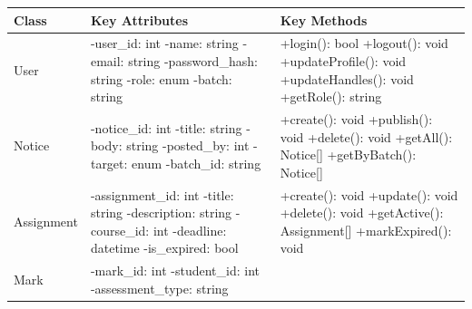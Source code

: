 \documentclass[12pt,a4paper]{article}
\newcommand{\THH}[1]{\small\bfseries\color{white} #1}
\begin{document}
\vspace{0.4em}
\begin{longtable}{|p{2.8cm}|p{5.5cm}|p{5.2cm}|}
\hline
\rowcolor{navyblue}
\THH{Class} & \THH{Key Attributes} & \THH{Key Methods} \\
\hline
\endhead
User &
-user\_id: int \newline
-name: string \newline
-email: string \newline
-password\_hash: string \newline
-role: enum \newline
-batch: string &
+login(): bool \newline
+logout(): void \newline
+updateProfile(): void \newline
+updateHandles(): void \newline
+getRole(): string \\
\hline
Notice &
-notice\_id: int \newline
-title: string \newline
-body: string \newline
-posted\_by: int \newline
-target: enum \newline
-batch\_id: string &
+create(): void \newline
+publish(): void \newline
+delete(): void \newline
+getAll(): Notice[] \newline
+getByBatch(): Notice[] \\
\hline
Assignment &
-assignment\_id: int \newline
-title: string \newline
-description: string \newline
-course\_id: int \newline
-deadline: datetime \newline
-is\_expired: bool &
+create(): void \newline
+update(): void \newline
+delete(): void \newline
+getActive(): Assignment[] \newline
+markExpired(): void \\
\hline
Mark &
-mark\_id: int \newline
-student\_id: int \newline
-assessment\_type: string \newline

\end{longtable}
\end{document}
